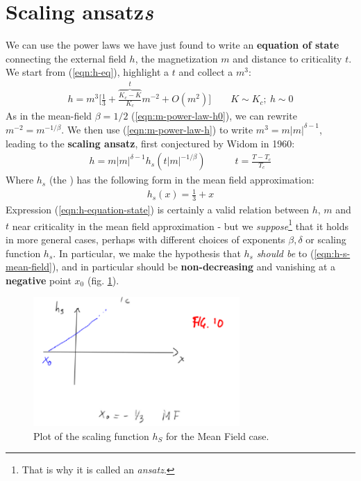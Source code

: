 \documentclass[../../main.tex]{subfiles}
\begin{document}
\section{Scaling ansatz\textit{s}}
We can use the power laws we have just found to write an \textbf{equation of state} connecting the external field $h$, the magnetization $m$ and distance to criticality $t$. 
We start from (\ref{eqn:h-eq}), highlight a $t$ and collect a $m^3$:
\begin{align*}
    h = m^3 \Bigg[\frac{1}{3} + \overbrace{\frac{K_c - K}{K_c}}^{t}m^{-2} + O(m^2) \Bigg] \qquad K \sim K_c;\> h\sim 0
\end{align*}
As in the mean-field $\beta = 1/2$ (\ref{eqn:m-power-law-h0}), we can rewrite $m^{-2} = m^{-1/\beta}$. We then use (\ref{eqn:m-power-law-h}) to write $m^3 = m|m|^{\delta-1}$, leading to the \textbf{scaling ansatz}, first conjectured by Widom in 1960:
\begin{align}\label{eqn:h-equation-state}
    h = m|m|^{\delta -1} h_s(t|m|^{-1/\beta}) \qquad  \quad t = \frac{T-T_c}{T_c}  
\end{align}
Where $h_s$ (the ) has the following form in the mean field approximation:
\begin{align}
    h_s(x) = \frac{1}{3} + x
    \label{eqn:h-s-mean-field}
\end{align}
Expression (\ref{eqn:h-equation-state}) is certainly a valid relation between $h$, $m$ and $t$ near criticality in the mean field approximation - but we \textit{suppose}\footnote{That is why it is called an \textit{ansatz}.} that it holds in more general cases, perhaps with different choices of exponents $\beta, \delta$ or scaling function $h_s$. In particular, we make the hypothesis that $h_s$ \textit{should be } to (\ref{eqn:h-s-mean-field}), and in particular should be \textbf{non-decreasing} and vanishing at a \textbf{negative} point $x_0$  (fig. \ref{fig:scaling-function}).

\begin{figure}[H]
    \centering
    \includegraphics[width=0.7\textwidth]{scaling-function.png}
    \caption{Plot of the scaling function $h_S$ for the Mean Field case.}
    \label{fig:scaling-function}
\end{figure}
\end{document}
